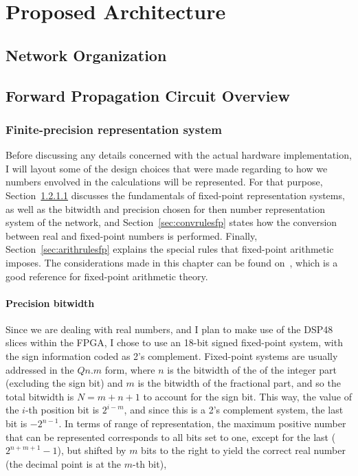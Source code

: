 \chapter{Proposed Architecture}\label{chap:propSol}

\section{Network Organization}

\section{Forward Propagation Circuit Overview}

\subsection{Finite-precision representation system}
Before discussing any details concerned with the actual hardware implementation, I will layout some of the design choices that were made regarding to how we numbers envolved in the calculations will be represented. For that purpose, Section~\ref{sec:precbit} discusses the fundamentals of fixed-point representation systems, as well as the bitwidth and precision chosen for then number representation system of the network, and Section~\ref{sec:convrulesfp} states how the conversion between real and fixed-point numbers is performed. Finally, Section~\ref{sec:arithrulesfp} explains the special rules that fixed-point arithmetic imposes. The considerations made in this chapter can be found on~\cite{Yates13}, which is a good reference for fixed-point arithmetic theory.

\subsubsection{Precision bitwidth}\label{sec:precbit} 
Since we are dealing with real numbers, and I plan to make use of the DSP48 slices within the FPGA, I chose to use an 18-bit signed fixed-point system, with the sign information coded as 2's complement. Fixed-point systems are usually addressed in the $Qn.m$ form, where $n$ is the bitwidth of the of the integer part (excluding the sign bit) and $m$ is the bitwidth of the fractional part, and so the total bitwidth is $N=m+n+1$ to account for the sign bit. This way, the value of the $i$-th position bit is $2^{i-m}$, and since this is a 2's complement system, the last bit is $-2^{n-1}$. In terms of range of representation, the maximum positive number that can be represented corresponds to all bits set to one, except for the last ($2^{n+m+1}-1$), but shifted by $m$ bits to the right to yield the correct real number (the decimal point is at the $m$-th bit), 


